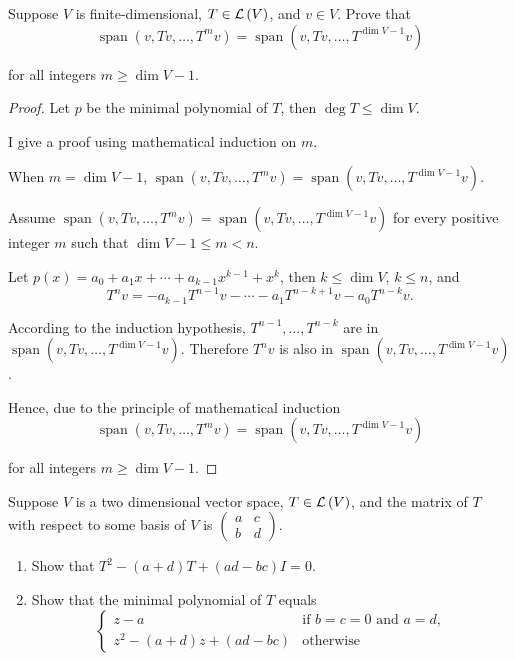 \begin{exercise}
    Suppose $V$ is finite-dimensional, $T\in\mathcal{L}\left({V}\right)$, and $v\in V$. Prove that
    \[
        \operatorname{span}(v, Tv, \ldots, T^{m}v) = \operatorname{span}(v, Tv, \ldots, T^{\dim V - 1}v)
    \]

    for all integers $m\geq \dim V - 1$.
\end{exercise}

\begin{proof}
    Let $p$ be the minimal polynomial of $T$, then $\deg T\leq \dim V$.

    I give a proof using mathematical induction on $m$.

    When $m = \dim V - 1$, $\operatorname{span}(v, Tv, \ldots, T^{m}v) = \operatorname{span}(v, Tv, \ldots, T^{\dim V - 1}v)$.

    Assume $\operatorname{span}(v, Tv, \ldots, T^{m}v) = \operatorname{span}(v, Tv, \ldots, T^{\dim V - 1}v)$ for every positive integer $m$ such that $\dim V - 1\leq m < n$.

    Let $p(x) = a_{0} + a_{1}x + \cdots + a_{k-1}x^{k-1} + x^{k}$, then $k\leq \dim V$, $k\leq n$, and
    \[
        T^{n}v = -a_{k-1}T^{n-1}v - \cdots - a_{1}T^{n-k+1}v - a_{0}T^{n-k}v.
    \]

    According to the induction hypothesis, $T^{n-1}, \ldots, T^{n-k}$ are in $\operatorname{span}(v, Tv, \ldots, T^{\dim V - 1}v)$. Therefore $T^{n}v$ is also in $\operatorname{span}(v, Tv, \ldots, T^{\dim V - 1}v)$.

    Hence, due to the principle of mathematical induction
    \[
        \operatorname{span}(v, Tv, \ldots, T^{m}v) = \operatorname{span}(v, Tv, \ldots, T^{\dim V - 1}v)
    \]

    for all integers $m\geq \dim V - 1$.
\end{proof}
\newpage

\begin{exercise}
    Suppose $V$ is a two dimensional vector space, $T\in\mathcal{L}\left({V}\right)$, and the matrix of $T$ with respect to some basis of $V$ is $\begin{pmatrix}a & c \\ b & d\end{pmatrix}$.
    \begin{enumerate}[label={(\alph*)}]
        \item Show that $T^{2} - (a + d)T + (ad - bc)I = 0$.
        \item Show that the minimal polynomial of $T$ equals
              \[
                  \begin{cases}
                      z - a                        & \text{if $b = c = 0$ and $a = d$}, \\
                      z^{2} - (a + d)z + (ad - bc) & \text{otherwise}
                  \end{cases}
              \]
    \end{enumerate}
\end{exercise}

